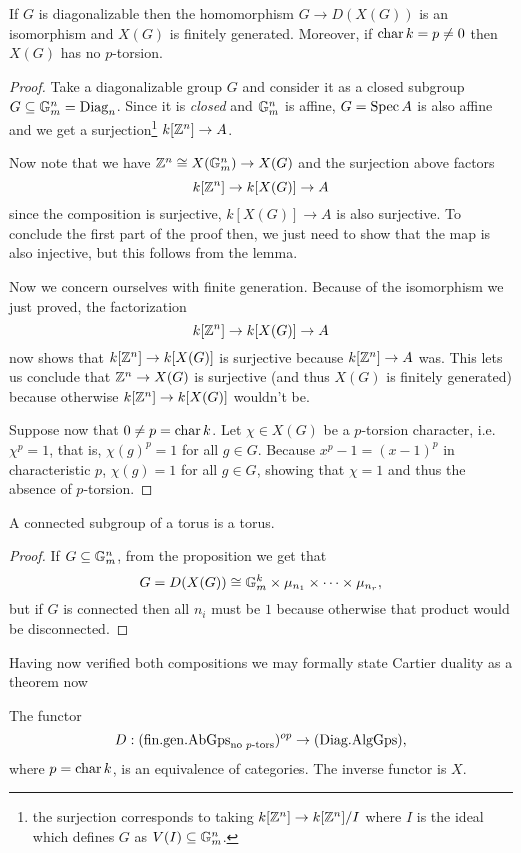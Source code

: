\begin{proposition}
If $G$ is diagonalizable then the homomorphism $G\to D(X(G))$ is an isomorphism and $X(G)$ is finitely generated. Moreover, if $\operatorname{char} k=p\neq 0$ then $X(G)$ has no $p$-torsion.
\end{proposition}
\begin{proof}
Take a diagonalizable group $G$ and consider it as a closed subgroup $G\subseteq \mathbb{G}_m^n=\mathrm{Diag}_n$. Since it is \textit{closed} and $\mathbb{G}_m^n$ is affine, $G=\operatorname{Spec} A$ is also affine and we get a surjection\footnote{the surjection corresponds to taking $k[\mathbb{Z}^n]\to k[\mathbb{Z}^n]/I$ where $I$ is the ideal which defines $G$ as $V(I)\subseteq \mathbb{G}_m^n$.} $k[\mathbb{Z}^n]\to A$.

Now note that we have $\mathbb{Z}^n\cong X(\mathbb{G}_m^n)\to X(G)$ and the surjection above factors 
\[k[\mathbb{Z}^n]\to k[X(G)]\to A\]
since the composition is surjective, $k[X(G)]\to A$ is also surjective. To conclude the first part of the proof then, we just need to show that the map is also injective, but this follows from the lemma.

\medskip

Now we concern ourselves with finite generation. Because of the isomorphism we just proved, the factorization
\[k[\mathbb{Z}^n]\to k[X(G)]\to A\]
now shows that $k[\mathbb{Z}^n]\to k[X(G)]$ is surjective because $k[\mathbb{Z}^n]\to A$ was. This lets us conclude that $\mathbb{Z}^n\to X(G)$ is surjective (and thus $X(G)$ is finitely generated) because otherwise $k[\mathbb{Z}^n]\to k[X(G)]$ wouldn't be.


Suppose now that $0\neq p=\operatorname{char} k$. Let $\chi\in X(G)$ be a $p$-torsion character, i.e. $\chi^p=1$, that is, $\chi(g)^p=1$ for all $g\in G$. Because $x^p-1=(x-1)^p$ in characteristic $p$, $\chi(g)=1$ for all $g\in G$, showing that $\chi=1$ and thus the absence of $p$-torsion.
\end{proof}




\begin{corollary}
A connected subgroup of a torus is a torus.
\end{corollary}
\begin{proof}
If $G\subseteq \mathbb{G}_m^n$, from the proposition we get that 
\[G=D(X(G))\cong \mathbb{G}_m^k\times \mu_{n_1}\times\cdots\times \mu_{n_r},\] 
but if $G$ is connected then all $n_i$ must be $1$ because otherwise that product would be disconnected.
\end{proof}

Having now verified both compositions we may formally state Cartier duality as a theorem now
\begin{theorem}\label{ThCartierDuality}
The functor
\[D:(\text{fin.gen.AbGps}_{\text{no $p$-tors}})^{op}\to (\text{Diag.AlgGps}),\]
where $p=\operatorname{char} k$, is an equivalence of categories. The inverse functor is $X$.
\end{theorem}


